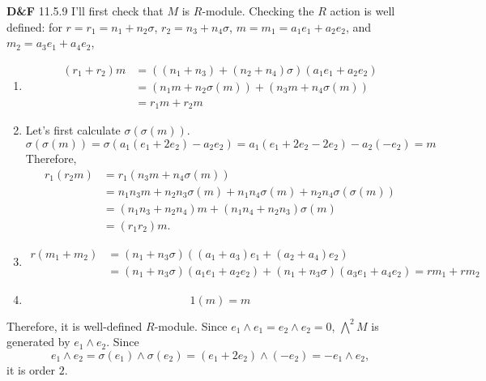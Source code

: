 \documentclass[a4paper, 12pt]{article}
\theoremstyle{Mydefinition}
\theoremstyle{Mytheorem}
\begin{document}
\noindent \textbf{D\&F} 11.5.9
I'll first check that $M$ is $R$-module. Checking the $R$ action is well defined: for $r = r_1 = n_1+n_2\sigma$, $r_2 = n_3+n_4\sigma$, $m = m_1=a_1e_1+a_2e_2$, and $m_2 = a_3e_1+a_4e_2$,
\begin{enumerate}
    \item 
    \begin{equation}
        \begin{split}
            (r_1+r_2)m &= ((n_1+n_3)+(n_2+n_4)\sigma)(a_1e_1+a_2e_2) \\
            &= (n_1m + n_2\sigma(m)) + (n_3m + n_4\sigma(m))\\
            &=r_1m+r_2m
        \end{split}
    \end{equation}
    \item 
    Let's first calculate $\sigma(\sigma(m))$.
    \begin{equation}
        \sigma(\sigma(m)) = \sigma(a_1(e_1+2e_2)-a_2e_2) = a_1(e_1+2e_2-2e_2)-a_2(-e_2) = m
    \end{equation}
    Therefore,
        \begin{equation}
        \begin{split}
            r_1(r_2m) &= r_1(n_3m + n_4\sigma(m))\\
            &=n_1n_3m + n_2n_3\sigma(m) + n_1n_4\sigma(m) + n_2n_4\sigma(\sigma(m))\\
            &=(n_1n_3+n_2n_4)m + (n_1n_4+n_2n_3)\sigma(m)\\
            &=(r_1r_2)m.
        \end{split}
    \end{equation}

    \item \begin{equation}
        \begin{split}
            r(m_1+m_2) &= (n_1+n_3\sigma)((a_1+a_3)e_1+(a_2+a_4)e_2) \\
            &= (n_1+n_3\sigma)(a_1e_1+a_2e_2) + (n_1+n_3\sigma)(a_3e_1+a_4e_2) = rm_1+rm_2
        \end{split}
    \end{equation}
    \item
    \begin{equation}
        1(m) = m
    \end{equation}
\end{enumerate}
Therefore, it is well-defined $R$-module. Since $e_1\wedge e_1 = e_2\wedge e_2 = 0$, $\bigwedge^2 M$ is generated by $e_1\wedge e_2$. Since
    \begin{equation}
        e_1\wedge e_2 = \sigma(e_1)\wedge \sigma(e_2) = (e_1+2e_2)\wedge (-e_2) = -e_1\wedge e_2,
    \end{equation}
    it is order $2$.\\
\end{document}
